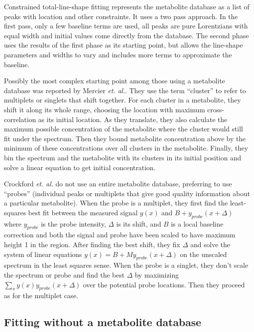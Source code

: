 \documentclass[10pt,letterpaper]{article}
\begin{document}
Constrained total-line-shape fitting \cite{Laatikainen1996,Soininen2005} represents the metabolite database as 
a list of peaks with location and other constraints. It uses a two pass approach. In the first pass, only a few
baseline terms are used, all peaks are pure Lorentzians with equal width and initial values come directly from
the database. The second phase uses the results of the first phase as its starting point, but allows the 
line-shape parameters and widths to vary and includes more terms to approximate the baseline.

Possibly the most complex starting point among those using a metabolite database was reported by Mercier 
\textit{et. al.}\cite{Mercier2011}. They use the term ``cluster'' to refer to multiplets or singlets that
shift together. For each cluster in a metabolite, they shift it along its whole range, choosing the location
with maximum cross-correlation as its initial location. As they translate, they also calculate the maximum 
possible concentration of the metabolite where the cluster would still fit under the spectrum. Then they bound
metabolite concentration above by the minimum of these concentrations over all clusters in the metabolite. Finally,
they bin the spectrum and the metabolite with its clusters in its initial position and solve a linear equation
to get initial concentration.

Crockford \textit{et. al.}\cite{Crockford2005} do not use an entire metabolite database, preferring to use 
``probes'' (individual peaks or multiplets that give good quality information about a particular metabolite).
When the probe is a multiplet, they first find the least-squares best fit between the measured signal \(y(x)\) and
\(B+y_{probe}(x+\Delta)\) where \(y_{probe}\) is the probe intensity, \(\Delta\) is its shift, and \(B\) is a
local baseline correction and both the signal and probe have been scaled to have maximum height 1 in the region.
After finding the best shift, they fix \(\Delta\) and solve the system of linear equations 
\(y(x)=B+M y_{probe}(x+\Delta)\) on the unscaled spectrum in the least squares sense. When the probe is a singlet,
they don't scale the spectrum or probe and find the best \(\Delta\) by maximizing \(\sum_x y(x) y_{probe}(x+\Delta)\) 
over the potential probe locations. Then they proceed as for the multiplet case.

\subsection{Fitting without a metabolite database}
\end{document}

